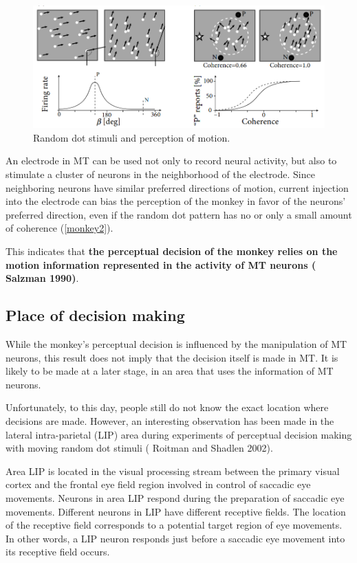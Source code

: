 \documentclass[12pt,hyperref,a4paper,UTF8]{ctexart}
\begin{document}
\begin{figure}[h]
    \begin{center}
    \includegraphics[width=\textwidth]{monkey2.png}
    \caption{Random dot stimuli and perception of motion.}
    \label{monkey2}
    \end{center}
\end{figure}

An electrode in MT can be used not only to record neural activity, but also to stimulate a cluster of neurons in the neighborhood of the electrode. Since neighboring neurons have similar preferred directions of motion, current injection into the electrode can bias the perception of the monkey in favor of the neurons' preferred direction, even if the random dot pattern has no or only a small amount of coherence (\autoref{monkey2}). 

This indicates that \textbf{the perceptual decision of the monkey relies on the motion information represented in the activity of MT neurons (\cite{Salzman 1990} Salzman 1990)}.

\subsection{Place of decision making}

While the monkey's perceptual decision is influenced by the manipulation of MT neurons, this result does not imply that the decision itself is made in MT. It is likely to be made at a later stage, in an area that uses the information of MT neurons.

Unfortunately, to this day, people still do not know the exact location where decisions are made. However, an interesting observation has been made in the lateral intra-parietal (LIP) area during experiments of perceptual decision making with moving random dot stimuli (\cite{Roitman and Shadlen 2002} Roitman and Shadlen 2002). 

Area LIP is located in the visual processing stream between the primary visual cortex and the frontal eye field region involved in control of saccadic eye movements. Neurons in area LIP respond during the preparation of saccadic eye movements. Different neurons in LIP have different receptive fields. The location of the receptive field corresponds to a potential target region of eye movements. In other words, a LIP neuron responds just before a saccadic eye movement into its receptive field occurs.
\end{document}
